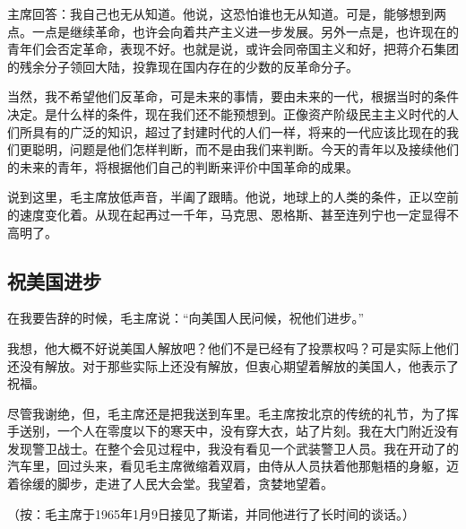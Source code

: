 主席回答：我自己也无从知道。他说，这恐怕谁也无从知道。可是，能够想到两点。一点是继续革命，也许会向着共产主义进一步发展。另外一点是，也许现在的青年们会否定革命，表现不好。也就是说，或许会同帝国主义和好，把蒋介石集团的残余分子领回大陆，投靠现在国内存在的少数的反革命分子。

当然，我不希望他们反革命，可是未来的事情，要由未来的一代，根据当时的条件决定。是什么样的条件，现在我们还不能预想到。正像资产阶级民主主义时代的人们所具有的广泛的知识，超过了封建时代的人们一样，将来的一代应该比现在的我们更聪明，问题是他们怎样判断，而不是由我们来判断。今天的青年以及接续他们的未来的青年，将根据他们自己的判断来评价中国革命的成果。

说到这里，毛主席放低声音，半阖了跟睛。他说，地球上的人类的条件，正以空前的速度变化着。从现在起再过一千年，马克思、恩格斯、甚至连列宁也一定显得不高明了。

\subsection{祝美国进步}

在我要告辞的时候，毛主席说：“向美国人民问候，祝他们进步。”

我想，他大概不好说美国人解放吧？他们不是已经有了投票权吗？可是实际上他们还没有解放。对于那些实际上还没有解放，但衷心期望着解放的美国人，他表示了祝福。

尽管我谢绝，但，毛主席还是把我送到车里。毛主席按北京的传统的礼节，为了挥手送别，一个人在零度以下的寒天中，没有穿大衣，站了片刻。我在大门附近没有发现警卫战士。在整个会见过程中，我没有看见一个武装警卫人员。我在开动了的汽车里，回过头来，看见毛主席微缩着双肩，由侍从人员扶着他那魁梧的身躯，迈着徐缓的脚步，走进了人民大会堂。我望着，贪婪地望着。

（按：毛主席于1965年1月9日接见了斯诺，并同他进行了长时间的谈话。）

